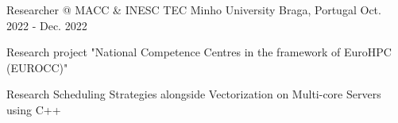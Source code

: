 
\begin{cventries}


\cventry
{Researcher @ MACC \& INESC TEC}
{Minho University} %
{Braga, Portugal} %
{Oct. 2022 - Dec. 2022} %
{ %
\begin{cvitems}
\item{Research project "National Competence Centres in the framework of EuroHPC (EUROCC)"}
\item{Research Scheduling Strategies alongside Vectorization on Multi-core
  Servers using C++}
\end{cvitems}
}

\end{cventries}
